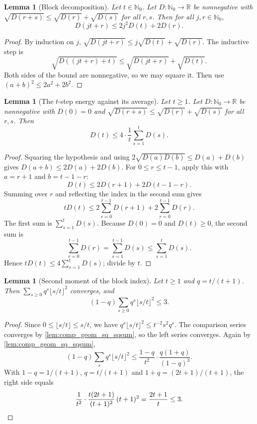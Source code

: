 \documentclass[11pt]{article}
\newtheorem{lemma}[theorem]{Lemma}
\theoremstyle{definition}
\theoremstyle{remark}
\newcommand{\R}{\mathbb{R}}
\newcommand{\Nz}{\mathbb{N}_0}
\begin{document}
\begin{lemma}[Block decomposition]\label{lem:comp_block}
Let $t\in\Nz$. Let $D:\Nz\to\R$ be nonnegative with $\sqrt{D(r+s)}\le\sqrt{D(r)}+\sqrt{D(s)}$ for all $r,s$. Then for all $j,r\in\Nz$,
\[
D(jt+r)\le 2j^2D(t)+2D(r).
\]
\end{lemma}
\begin{proof}
By induction on $j$, $\sqrt{D(jt+r)}\le j\sqrt{D(t)}+\sqrt{D(r)}$. The inductive step is
\[
\sqrt{D((jt+r)+t)}\le\sqrt{D(jt+r)}+\sqrt{D(t)}.
\]
Both sides of the bound are nonnegative, so we may square it. Then use $(a+b)^2\le2a^2+2b^2$.
\end{proof}

\begin{lemma}[The $t$-step energy against its average]\label{lem:comp_Dt}
Let $t\ge1$. Let $D:\Nz\to\R$ be nonnegative with $D(0)=0$ and $\sqrt{D(r+s)}\le\sqrt{D(r)}+\sqrt{D(s)}$ for all $r,s$. Then
\[
D(t)\le 4\cdot\frac1t\sum_{s=1}^tD(s).
\]
\end{lemma}
\begin{proof}
Squaring the hypothesis and using $2\sqrt{D(a)D(b)}\le D(a)+D(b)$ gives $D(a+b)\le2D(a)+2D(b)$. For $0\le r\le t-1$, apply this with $a=r+1$ and $b=t-1-r$:
\[
D(t)\le2D(r+1)+2D(t-1-r).
\]
Summing over $r$ and reflecting the index in the second sum gives
\[
tD(t)\le2\sum_{r=0}^{t-1}D(r+1)+2\sum_{r=0}^{t-1}D(r).
\]
The first sum is $\sum_{s=1}^tD(s)$. Because $D(0)=0$ and $D(t)\ge0$, the second sum is
\[
\sum_{r=0}^{t-1}D(r)=\sum_{s=1}^{t-1}D(s)\le\sum_{s=1}^tD(s).
\]
Hence $tD(t)\le4\sum_{s=1}^tD(s)$; divide by $t$.
\end{proof}

\begin{lemma}[Second moment of the block index]\label{lem:comp_geom_sq}
Let $t\ge1$ and $q=t/(t+1)$. Then $\sum_{s\ge0}q^s\lfloor s/t\rfloor^2$ converges, and
\[
(1-q)\sum_{s\ge0}q^s\lfloor s/t\rfloor^2\le3 .
\]
\end{lemma}
\begin{proof}
Since $0\le\lfloor s/t\rfloor\le s/t$, we have $q^s\lfloor s/t\rfloor^2\le t^{-2}s^2q^s$. The comparison series converges by \cref{lem:comp_geom_sq_sqsum}, so the left series converges. Again by \cref{lem:comp_geom_sq_sqsum},
\[
(1-q)\sum_sq^s\lfloor s/t\rfloor^2\le\frac{1-q}{t^2}\cdot\frac{q(1+q)}{(1-q)^3} .
\]
With $1-q=1/(t+1)$, $q=t/(t+1)$ and $1+q=(2t+1)/(t+1)$, the right side equals
\[
\frac{1}{t^2}\cdot\frac{t(2t+1)}{(t+1)^2}\,(t+1)^2=\frac{2t+1}{t}\le3. \qedhere
\]
\end{proof}
\end{document}
